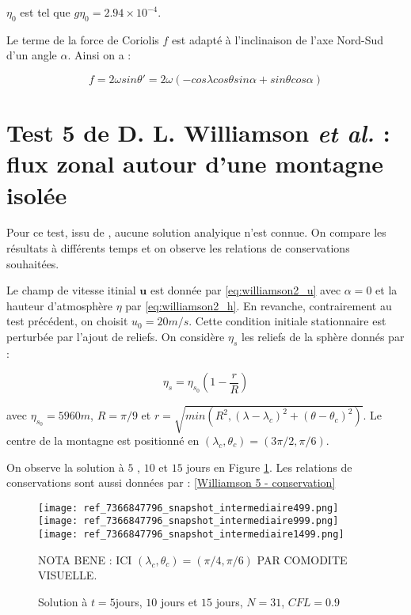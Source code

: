 $\eta_0$ est tel que $g \eta_0 = 2.94 \times 10^{-4}$. 

Le terme de la force de Coriolis $f$ est adapté à l'inclinaison de l'axe Nord-Sud d'un angle $\alpha$. Ainsi on a :

$$ f = 2 \omega sin \theta' = 2 \omega \left( -cos \lambda cos \theta sin \alpha + sin \theta cos \alpha \right)$$





\section{Test 5 de D. L. Williamson \textit{et al.} : flux zonal autour d'une montagne isolée}

Pour ce test, issu de \cite{Williamson1992}, aucune solution analyique n'est connue. On compare les résultats à différents temps et on observe les relations de conservations souhaitées.

Le champ de vitesse itinial $\mathbf{u}$ est donnée par \eqref{eq:williamson2_u} avec $\alpha=0$ et la hauteur d'atmosphère $\eta$ par \eqref{eq:williamson2_h}. En revanche, contrairement au test précédent, on choisit $u_0=20m/s$.
Cette condition initiale stationnaire est perturbée par l'ajout de reliefs. On considère $\eta_s$ les reliefs de la sphère donnés par :

\begin{equation}
\eta_s = \eta_{s_0} \left( 1 - \dfrac{r}{R} \right)
\end{equation}

avec $\eta_{s_0}=5960m$, $R=\pi/9$ et $r = \sqrt{min\left( R^2, \left( \lambda-\lambda_c \right)^2 + \left( \theta-\theta_c \right)^2 \right)}$.
Le centre de la montagne est positionné en $(\lambda_c, \theta_c) = (3\pi/2, \pi/6)$.

On observe la solution à $5$ , $10$ et $15$ jours en Figure \ref{Williamson 5 - visuel}. Les relations de conservations sont aussi données par : \ref{Williamson 5 - conservation}

\begin{figure}
\begin{center}
\texttt{[image: ref\_7366847796\_snapshot\_intermediaire499.png]}\\
\texttt{[image: ref\_7366847796\_snapshot\_intermediaire999.png]}\\
\texttt{[image: ref\_7366847796\_snapshot\_intermediaire1499.png]}
\end{center}
\caption{Solution à $t=5$jours, $10$ jours et $15$ jours, $N=31$, $CFL=0.9$}
\begin{com}
NOTA BENE : ICI $(\lambda_c, \theta_c)=(\pi/4, \pi/6)$ PAR COMODITE VISUELLE.
\end{com}
\label{Williamson 5 - visuel} 
\end{figure}

